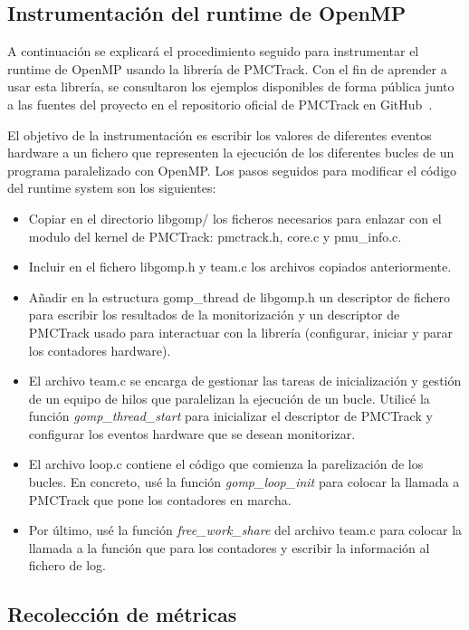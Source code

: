 \subsection{Instrumentación del runtime de OpenMP}\label{sec:instrum}

A continuación se explicará el procedimiento seguido para instrumentar el runtime de OpenMP usando la librería de PMCTrack. Con el fin de aprender a usar esta librería, se consultaron los ejemplos disponibles de forma pública junto a las fuentes del proyecto en el repositorio oficial de PMCTrack en GitHub~\cite{pmc-git}.

El objetivo de la instrumentación es escribir los valores de diferentes eventos hardware a un fichero que representen la ejecución de los diferentes bucles de un programa paralelizado con OpenMP. Los pasos seguidos para modificar el código del runtime system son los siguientes:

\begin{itemize}
  \item Copiar en el directorio libgomp/ los ficheros necesarios para enlazar con el modulo del kernel de PMCTrack: pmctrack.h, core.c y pmu\_info.c.
  \item Incluir en el fichero libgomp.h y team.c los archivos copiados anteriormente.
  \item Añadir en la estructura gomp\_thread de libgomp.h un descriptor de fichero  para escribir los resultados de la monitorización y un descriptor de PMCTrack usado para interactuar con la librería (configurar, iniciar y parar los contadores hardware).
  \item El archivo team.c se encarga de gestionar las tareas de inicialización y gestión de un equipo de hilos que paralelizan la ejecución de un bucle. Utilicé la función \emph{gomp\_thread\_start} para inicializar el descriptor de PMCTrack y configurar los eventos hardware que se desean monitorizar.
  \item El archivo loop.c contiene el código que comienza la parelización de los bucles. En concreto, usé la función \emph{gomp\_loop\_init} para colocar la llamada a PMCTrack que pone los contadores en marcha.
  \item Por último, usé la función \emph{free\_work\_share} del archivo team.c para colocar la llamada a la función que para los contadores y escribir la información al fichero de log.
\end{itemize}


\subsection{Recolección de métricas}\label{sec:recolecc}

